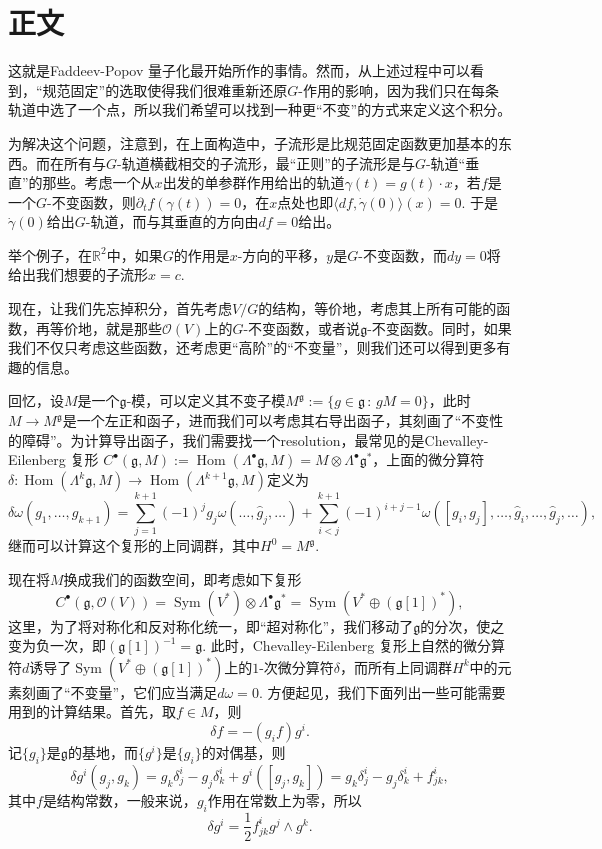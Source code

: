 \documentclass[11pt]{article}
\theoremstyle{definition}
\theoremstyle{plain}
\begin{document}
\section{正文}

这就是Faddeev-Popov 量子化最开始所作的事情。然而，从上述过程中可以看到，“规范固定”的选取使得我们很难重新还原$G$-作用的影响，因为我们只在每条轨道中选了一个点，所以我们希望可以找到一种更“不变”的方式来定义这个积分。

为解决这个问题，注意到，在上面构造中，子流形是比规范固定函数更加基本的东西。而在所有与$G$-轨道横截相交的子流形，最“正则”的子流形是与$G$-轨道“垂直”的那些。考虑一个从$x$出发的单参群作用给出的轨道$\gamma(t)=g(t)\cdot x$，若$f$是一个$G$-不变函数，则$\partial_t f(\gamma(t))=0$，在$x$点处也即$\langle df,\dot{\gamma}(0)\rangle(x)=0$. 于是$\dot \gamma(0)$给出$G$-轨道，而与其垂直的方向由$df=0$给出。

举个例子，在$\mathbb R^2$中，如果$G$的作用是$x$-方向的平移，$y$是$G$-不变函数，而$dy=0$将给出我们想要的子流形$x=c$.

现在，让我们先忘掉积分，首先考虑$V/G$的结构，等价地，考虑其上所有可能的函数，再等价地，就是那些$\mathscr O(V)$上的$G$-不变函数，或者说$\mathfrak{g}$-不变函数。同时，如果我们不仅只考虑这些函数，还考虑更“高阶”的“不变量”，则我们还可以得到更多有趣的信息。

回忆，设$M$是一个$\mathfrak g$-模，可以定义其不变子模$M^{\mathfrak g}:=\{g \in \mathfrak g\,:\, gM=0\}$，此时$M\to M^{\mathfrak g}$是一个左正和函子，进而我们可以考虑其右导出函子，其刻画了“不变性的障碍”。为计算导出函子，我们需要找一个resolution，最常见的是Chevalley-Eilenberg 复形 $C^\bullet(\mathfrak g,M):=\operatorname{Hom}(\Lambda^\bullet \mathfrak g,M)=M\otimes \Lambda^\bullet \mathfrak g^*$，上面的微分算符$\delta:\operatorname{Hom}(\Lambda^k \mathfrak g,M)\to \operatorname{Hom}(\Lambda^{k+1} \mathfrak g,M)$定义为
\[
    \delta\omega(g_1,\dots,g_{k+1})=\sum_{j=1}^{k+1} (-1)^{j}g_j\omega(\dots,\hat{g}_j,\dots)+\sum_{i<j}^{k+1} (-1)^{i+j-1}\omega([g_i,g_j],\dots,\hat{g}_i,\dots,\hat{g}_j,\dots),
\]继而可以计算这个复形的上同调群，其中$H^0=M^{\mathfrak g}$.

现在将$M$换成我们的函数空间，即考虑如下复形
\[
C^\bullet(\mathfrak g,\mathcal O(V))=\operatorname{Sym}(V^*)\otimes \Lambda^\bullet \mathfrak g^*
=\operatorname{Sym}(V^*\oplus (\mathfrak g[1])^*),
\]这里，为了将对称化和反对称化统一，即“超对称化”，我们移动了$\mathfrak g$的分次，使之变为负一次，即$(\mathfrak g[1])^{-1}=\mathfrak g$. 此时，Chevalley-Eilenberg 复形上自然的微分算符$d$诱导了$\operatorname{Sym}(V^*\oplus (\mathfrak g[1])^*)$上的$1$-次微分算符$\delta$，而所有上同调群$H^k$中的元素刻画了“不变量”，它们应当满足$d\omega=0$. 方便起见，我们下面列出一些可能需要用到的计算结果。首先，取$f\in M$，则
\[
    \delta f=-(g_if)g^i.
\]
记$\{g_i\}$是$\mathfrak g$的基地，而$\{g^i\}$是$\{g_i\}$的对偶基，则
\[
    \delta g^i(g_j,g_k)=g_k\delta^i_j-g_j\delta^i_{k}+g^i([g_j,g_k])=g_k\delta^i_j-g_j\delta^i_{k}+f^i_{jk},
\]
其中$f$是结构常数，一般来说，$g_i$作用在常数上为零，所以
\[
    \delta g^i=\frac 12 f^i_{jk}g^j\wedge g^k.
\]
\end{document}
